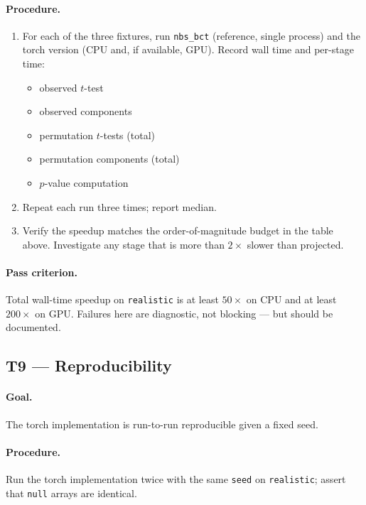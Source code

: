 \documentclass[11pt]{article}
\begin{document}
\paragraph{Procedure.}
\begin{enumerate}[leftmargin=2.0em]
\item For each of the three fixtures, run \texttt{nbs\_bct} (reference, single process) and the torch version (CPU and, if available, GPU). Record wall time and per-stage time:
\begin{itemize}
\item observed $t$-test
\item observed components
\item permutation $t$-tests (total)
\item permutation components (total)
\item $p$-value computation
\end{itemize}
\item Repeat each run three times; report median.
\item Verify the speedup matches the order-of-magnitude budget in the table above. Investigate any stage that is more than $2\times$ slower than projected.
\end{enumerate}

\paragraph{Pass criterion.} Total wall-time speedup on \texttt{realistic} is at least $50\times$ on CPU and at least $200\times$ on GPU. Failures here are diagnostic, not blocking --- but should be documented.

\subsection{T9 --- Reproducibility}

\paragraph{Goal.} The torch implementation is run-to-run reproducible given a fixed seed.

\paragraph{Procedure.} Run the torch implementation twice with the same \texttt{seed} on \texttt{realistic}; assert that \texttt{null} arrays are identical.
\end{document}
